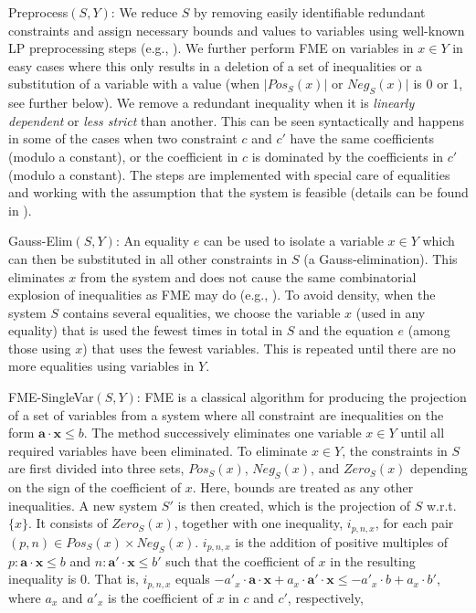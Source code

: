 \documentclass{llncs}
\newcommand{\Pos}{\mathit{Pos}}
\newcommand{\Neg}{\mathit{Neg}}
\newcommand{\mi}{\mathit}
\newcommand{\ve}{\mathbf}
\begin{document}
{{\sc Preprocess}$(S,Y)$:} We reduce $S$ by removing easily identifiable redundant constraints and assign necessary bounds and values to variables using well-known LP preprocessing steps (e.g., \cite{andersen95}). %
We further perform FME on variables in $x\in Y$ in easy cases where this only results in a deletion of a set of inequalities or a substitution of a variable with a value (when $|\Pos_S(x)|$ or $\Neg_S(x)|$ is 0 or 1, see further below). We remove a redundant inequality when it is \emph{linearly dependent} or \emph{less strict} than another. This can be seen syntactically and happens in some of the cases when two constraint $c$ and $c'$ have the same coefficients (modulo a constant), or the coefficient in $c$ is dominated by the coefficients in $c'$ (modulo a constant). 
The steps are implemented with special care of equalities and working with the assumption that the system is feasible (details can be found in \cite{mytechrep}).

{{\sc Gauss-Elim}$(S,Y)$:} An equality $e$ can be used to isolate a variable $x\in Y$ which can then be substituted in all other constraints in $S$ (a Gauss-elimination). This eliminates $x$ from the system and does not cause the same combinatorial explosion of inequalities as FME may do (e.g., \cite{duffin74,simon05}).
To avoid density, when the system $S$ contains several equalities, we choose the variable $x$ (used in any equality) that is used the fewest times in total in $S$ and the equation $e$ (among those using $x$) that uses the fewest variables. 
This is repeated until there are no more equalities using variables in $Y$.

{{\sc FME-SingleVar}$(S,Y)$:} FME is a classical algorithm for producing the projection of a set of variables from a system where all constraint are inequalities on the form $\ve{a}\cdot \ve{x}\leq b$. The method successively eliminates one variable $x\in Y$ until all required variables have been eliminated. To eliminate $x\in Y$, the constraints in $S$ are first divided into three sets, $\Pos_S(x)$, $\Neg_S(x)$, and $\mi{Zero}_S(x)$ depending on the sign of the coefficient of $x$. Here, bounds are treated as any other inequalities. 
A new system $S'$ is then created, which is the projection of $S$ w.r.t. $\{x\}$. It consists of $\mi{Zero}_S(x)$, together with one inequality, $i_{p,n,x}$, for each pair $(p,n)\in \Pos_S(x)\times \Neg_S(x)$. $i_{p,n,x}$ is the addition of positive multiples of $p:\ve{a}\cdot\ve{x} \leq b$ and $n:\ve{a}'\cdot\ve{x} \leq b'$ such that the coefficient of $x$ in the resulting inequality is $0$. That is, $i_{p,n,x}$ equals $-a'_x\cdot \ve{a}\cdot\ve{x} + a_x\cdot \ve{a}'\cdot\ve{x} \leq -a'_x\cdot b + a_x\cdot b'$, where $a_x$ and $a'_x$ is the coefficient of $x$ in $c$ and $c'$, respectively,
\end{document}
